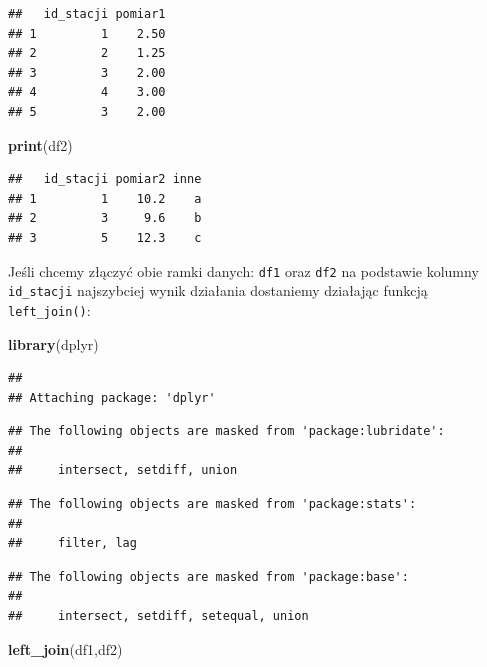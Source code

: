 \documentclass[]{book}
\newenvironment{Shaded}{\begin{snugshade}}{\end{snugshade}}
\newcommand{\KeywordTok}[1]{\textcolor[rgb]{0.13,0.29,0.53}{\textbf{#1}}}
\newcommand{\NormalTok}[1]{#1}
\theoremstyle{definition}
\theoremstyle{definition}
\theoremstyle{definition}
\theoremstyle{remark}
\begin{document}
\begin{verbatim}
##   id_stacji pomiar1
## 1         1    2.50
## 2         2    1.25
## 3         3    2.00
## 4         4    3.00
## 5         3    2.00
\end{verbatim}

\begin{Shaded}
\begin{Highlighting}[]
\KeywordTok{print}\NormalTok{(df2)}
\end{Highlighting}
\end{Shaded}

\begin{verbatim}
##   id_stacji pomiar2 inne
## 1         1    10.2    a
## 2         3     9.6    b
## 3         5    12.3    c
\end{verbatim}

Jeśli chcemy złączyć obie ramki danych: \texttt{df1} oraz \texttt{df2}
na podstawie kolumny \texttt{id\_stacji} najszybciej wynik działania
dostaniemy działając funkcją \texttt{left\_join()}:

\begin{Shaded}
\begin{Highlighting}[]
\KeywordTok{library}\NormalTok{(dplyr)}
\end{Highlighting}
\end{Shaded}

\begin{verbatim}
## 
## Attaching package: 'dplyr'
\end{verbatim}

\begin{verbatim}
## The following objects are masked from 'package:lubridate':
## 
##     intersect, setdiff, union
\end{verbatim}

\begin{verbatim}
## The following objects are masked from 'package:stats':
## 
##     filter, lag
\end{verbatim}

\begin{verbatim}
## The following objects are masked from 'package:base':
## 
##     intersect, setdiff, setequal, union
\end{verbatim}

\begin{Shaded}
\begin{Highlighting}[]
\KeywordTok{left_join}\NormalTok{(df1,df2)}
\end{Highlighting}
\end{Shaded}
\end{document}
